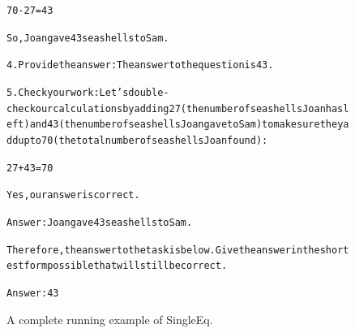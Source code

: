 \begin{figure}[t]
{{\begin{alltt}
70 - 27 = 43

So, Joan gave 43 seashells to Sam.

4. Provide the answer: The answer to the question is 43.

5. Check your work: Let's double-check our calculations by adding 27 (the number of seashells Joan has left) and 43 (the number of seashells Joan gave to Sam) to make sure they add up to 70 (the total number of seashells Joan found):

27 + 43 = 70

Yes, our answer is correct.

Answer: Joan gave 43 seashells to Sam.

Therefore, the answer to the task is below. Give the answer in the shortest form possible that will still be correct.

Answer: 43
\end{alltt}
}}
\caption{A complete running example of SingleEq.}
\label{fig:singleeq_example}
\end{figure}
